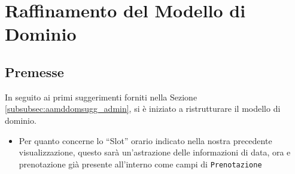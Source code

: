 \section{Raffinamento del Modello di Dominio}\label{sec:raffmoddom}

\subsection{Premesse}
In seguito ai primi suggerimenti forniti nella Sezione \vref{subsubsec:aamddomsugg_admin},
si è iniziato a ristrutturare il modello di dominio. 
\begin{itemize}
\item Per quanto concerne lo ``Slot'' orario indicato nella nostra precedente
	visualizzazione, questo sarà un'astrazione delle informazioni di data, ora e
	prenotazione già presente all'interno come campi di \texttt{Prenotazione}
\end{itemize}


